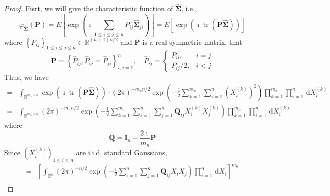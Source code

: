 \begin{proof}
    Fisrt, we will give the characteristic function of $\widehat{\boldsymbol{\Sigma}}$, i.e.,
    \begin{equation*}
        \varphi_{\widehat{\boldsymbol{\Sigma}}}\left(\mathbf{P}\right)=E\left[\exp\left(\imath\sum_{1\leq i\leq j\leq n}P_{ij}\widehat{\boldsymbol{\Sigma}}_{ji}\right)\right]=E\left[\exp\left(\imath\operatorname{tr}\left(\mathbf{P}\widehat{\boldsymbol{\Sigma}}\right)\right)\right]
    \end{equation*}
    where $\left\{P_{ij}\right\}_{1\leq i\leq j\leq n}\in\mathbb{R}^{(n+1)n/2}$ and $\mathbf{P}$ is a real symmetric matrix, that
    \begin{equation*}
        \mathbf{P}=\left\{\widehat{P}_{ij},\widehat{P}_{ij}=\widehat{P}_{ji}\right\}_{i,j=1}^{n},\quad\widehat{P}_{ij}=\begin{cases}P_{ii}, & i=j \\ P_{ij} / 2, & i<j \end{cases}
    \end{equation*}
    Thus, we have
    \begin{equation*}
        \begin{aligned}
            = & \int_{\mathbb{R}^{m_{n}\times n}}\exp\left(\imath\operatorname{tr}\left(\mathbf{P}\widehat{\boldsymbol{\Sigma}}\right)\right)\cdot(2\pi)^{-m_{n}n/2}\exp\left(-\frac{1}{2}\sum_{k=1}^{m_{n}}\sum_{i=1}^{n}\left(X_{i}^{(k)}\right)^{2}\right)\prod_{k=1}^{m_{n}}\prod_{i=1}^{n}\,\mathrm{d}X_{i}^{(k)} \\
            = & \int_{\mathbb{R}^{m_{n}\times n}}(2\pi)^{-m_{n}n/2}\exp\left(-\frac{1}{2}\sum_{k=1}^{m_{n}}\sum_{i=1}^{n}\sum_{j=1}^{n}\mathbf{Q}_{ij}X_{i}^{(k)}X_{j}^{(k)}\right)\prod_{k=1}^{m_{n}}\prod_{i=1}^{n}\,\mathrm{d}X_{i}^{(k)}
        \end{aligned}
    \end{equation*}
    where
    \begin{equation*}
        \mathbf{Q}=\mathbf{I}_{n}-\frac{2\imath}{m_{n}}\mathbf{P}
    \end{equation*}
    Since $\left(X_{i}^{(k)}\right)_{1\leq i\leq n}$ are i.i.d. standard Gaussians,
    \begin{equation*}
        \begin{aligned}
            = & \left[\int_{\mathbb{R}^{n}}(2\pi)^{-n/2}\exp\left(-\frac{1}{2}\sum_{i=1}^{n}\sum_{j=1}^{n}\mathbf{Q}_{ij}X_{i}X_{j}\right)\prod_{i=1}^{n}\,\mathrm{d}X_{i}\right]^{m_{n}}                                                                                                                         \\

\end{aligned}
\end{equation*}
\end{proof}
